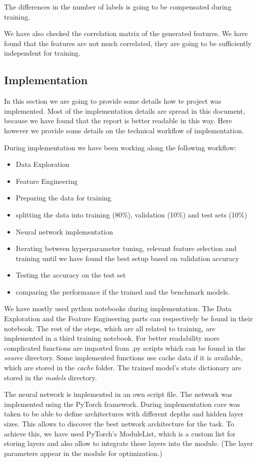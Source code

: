 The differences in the number of labels is going to be compensated during training.

We have also checked the correlation matrix of the generated features. We have found that the features are not much correlated, they are going to be sufficiently independent for training.

\subsection{Implementation} \label{sec3.4}
In this section we are going to provide some details how te project was implemented. Most of the implementation details are spread in this document, because we have found that the report is better readable in this way. Here however we provide some details on the technical workflow of implementation.

During implementation we have been working along the following workflow:
\begin{itemize}
	\item Data Exploration
	\item Feature Engineering
	\item Preparing the data for training
	\item splitting the data into training (80\%), validation (10\%) and test sets (10\%)
	\item Neural network implementation
	\item Iterating between hyperparameter tuning, relevant feature selection and training until we have found the best setup based on validation accuracy
	\item Testing the accuracy on the test set
	\item comparing the performance if the trained and the benchmark models.
\end{itemize}

We have mostly used python notebooks during implementation. The Data Exploration and the Feature Engineering parts can respectively be found in their notebook. The rest of the steps, which are all related to training, are implemented in a third training notebook. For better readability more complicated functions are imported from .py scripts which can be found in the \textit{source} directory. Some implemented functions use cache data if it is available, which are stored in the \textit{cache} folder. The trained model's state dictionary are stored in the \textit{models} directory. 

The neural network is implemented in an own script file. The network was implemented using the PyTorch framework. During implementation care was taken to be able to define architectures with different depths and hidden layer sizes. This allows to discover the best network architecture for the task. To achieve this, we have used PyTorch's ModuleList, which is a custom list for storing layers and also allow to integrate these layers into the module. (The layer parameters appear in the module for optimization.) 

